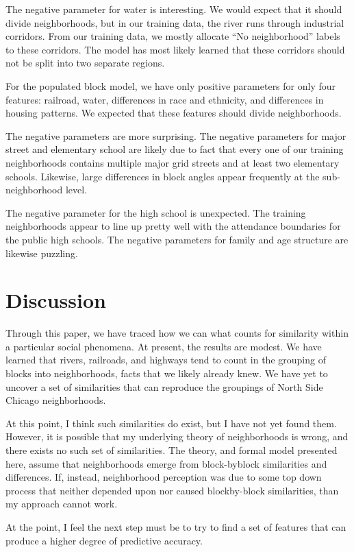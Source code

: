 \documentclass[12pt,letter]{article}\usepackage[]{graphicx}\usepackage[]{color}
\begin{document}
The negative parameter for water is interesting. We would expect that
it should divide neighborhoods, but in our training data, the river
runs through industrial corridors. From our training data, we mostly
allocate “No neighborhood” labels to these corridors. The model has
most likely learned that these corridors should not be split into two
separate regions.  

For the populated block model, we have only
positive parameters for only four features: railroad, water,
differences in race and ethnicity, and differences in housing
patterns. We expected that these features should divide neighborhoods.

The negative parameters are more surprising. The negative parameters
for major street and elementary school are likely due to fact that
every one of our training neighborhoods contains multiple major grid
streets and at least two elementary schools. Likewise, large
differences in block angles appear frequently at the sub-neighborhood
level.  

The negative parameter for the high school is unexpected. The
training neighborhoods appear to line up pretty well with the
attendance boundaries for the public high schools. The negative
parameters for family and age structure are likewise puzzling.

\section*{Discussion}
Through this paper, we have traced how we can what counts for similarity
within a particular social phenomena. At present, the results are modest.
We have learned that rivers, railroads, and highways tend to count in the
grouping of blocks into neighborhoods, facts that we likely already knew.
We have yet to uncover a set of similarities that can reproduce the groupings
of North Side Chicago neighborhoods.

At this point, I think such similarities do exist, but I have not yet
found them. However, it is possible that my underlying theory of
neighborhoods is wrong, and there exists no such set of
similarities. The theory, and formal model presented here, assume that
neighborhoods emerge from block-byblock similarities and
differences. If, instead, neighborhood perception was due to some top
down process that neither depended upon nor caused blockby-block
similarities, than my approach cannot work.  

At the point, I feel the
next step must be to try to find a set of features that can produce a
higher degree of predictive accuracy.
\end{document}
